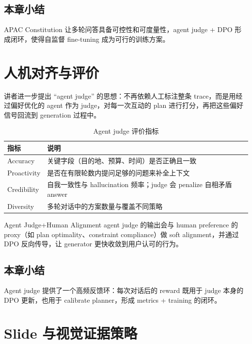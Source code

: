 \documentclass[a4paper]{article}
\begin{document}
\subsection{本章小结}

APAC Constitution 让多轮问答具备可控性和可度量性，agent judge + DPO 形成闭环，使得自监督 fine-tuning 成为可行的训练方案。

\section{人机对齐与评价}

讲者进一步提出 ``agent judge'' 的思想：不再依赖人工标注整条 trace，而是用经过偏好优化的 agent 作为 judge，对每一次互动的 plan 进行打分，再把这些偏好信号回流到 generation 过程中。
\begin{table}[H]
\centering
\begin{tabular}{lp{6cm}}
\toprule
指标 & 说明 \\
\midrule
Accuracy & 关键字段（目的地、预算、时间）是否正确且一致 \\
Proactivity & 是否在有限轮数内提问足够的问题来补全上下文 \\
Credibility & 自我一致性与 hallucination 频率；judge 会 penalize 自相矛盾 answer \\
Diversity & 多轮对话中的方案数量与覆盖不同策略 \\
\bottomrule
\end{tabular}
\caption{Agent judge 评价指标}
\end{table}

\begin{knowledgebox}{Agent Judge+Human Alignment}
agent judge 的输出会与 human preference 的 proxy（如 plan optimality、constraint compliance）做 soft alignment，并通过 DPO 反向传导，让 generator 更快收敛到用户认可的行为。
\end{knowledgebox}

\subsection{本章小结}

Agent judge 提供了一个高频反馈环：每次对话后的 reward 既用于 judge 本身的 DPO 更新，也用于 calibrate planner，形成 metrics + training 的闭环。

\section{Slide 与视觉证据策略}
\end{document}
